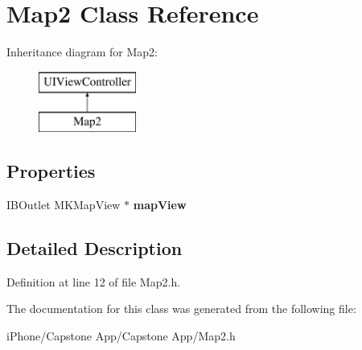 \hypertarget{interface_map2}{\section{Map2 Class Reference}
\label{interface_map2}
}
Inheritance diagram for Map2\-:\begin{figure}[H]
\begin{center}
\leavevmode
\includegraphics[height=2.000000cm]{interface_map2}
\end{center}
\end{figure}
\subsection*{Properties}
\begin{DoxyCompactItemize}
\item 
\hypertarget{interface_map2_a250ca1eb6ca5dbeef2c758cfb6c54352}{I\-B\-Outlet M\-K\-Map\-View $\ast$ {\bfseries map\-View}}\label{interface_map2_a250ca1eb6ca5dbeef2c758cfb6c54352}

\end{DoxyCompactItemize}


\subsection{Detailed Description}


Definition at line 12 of file Map2.\-h.



The documentation for this class was generated from the following file\-:\begin{DoxyCompactItemize}
\item 
i\-Phone/\-Capstone App/\-Capstone App/Map2.\-h\end{DoxyCompactItemize}
